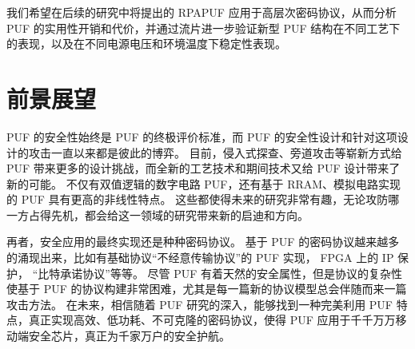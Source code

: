 我们希望在后续的研究中将提出的 RPAPUF 应用于高层次密码协议，从而分析 PUF 的实用性开销和代价，并通过流片进一步验证新型 PUF 结构在不同工艺下的表现，以及在不同电源电压和环境温度下稳定性表现。


\section{前景展望}

PUF 的安全性始终是 PUF 的终极评价标准，而 PUF 的安全性设计和针对这项设计的攻击一直以来都是彼此的博弈。
目前，侵入式探查、旁道攻击等崭新方式给 PUF 带来更多的设计挑战，而全新的工艺技术和期间技术又给 PUF 设计带来了新的可能\supercite{delvaux2013side,merli2013localized,helfmeier2013cloning}。
不仅有双值逻辑的数字电路 PUF，还有基于 RRAM、模拟电路实现的 PUF 具有更高的非线性特点\supercite{liu2015experimental,chen2015utilizing}。
这些都使得未来的研究非常有趣，无论攻防哪一方占得先机，都会给这一领域的研究带来新的启迪和方向。

再者，安全应用的最终实现还是种种密码协议。
基于 PUF 的密码协议越来越多的涌现出来，比如有基础协议``不经意传输协议''的 PUF 实现\supercite{ruhrmair2010oblivious}， FPGA 上的 IP 保护\supercite{kumar2008butterfly}， ``比特承诺协议''\supercite{ruhrmair2013practical}等等。
尽管 PUF 有着天然的安全属性，但是协议的复杂性使基于 PUF 的协议构建非常困难，尤其是每一篇新的协议模型总会伴随而来一篇攻击方法\supercite{ruhrmair2013pufs}。
在未来，相信随着 PUF 研究的深入，能够找到一种完美利用 PUF 特点，真正实现高效、低功耗、不可克隆的密码协议，使得 PUF 应用于千千万万移动端安全芯片，真正为千家万户的安全护航。